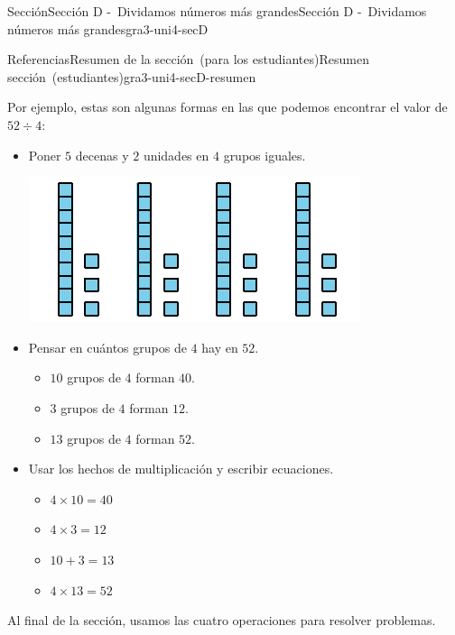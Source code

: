 \documentclass[oneside,10pt,]{article}
\begin{document}
\begin{sectionptx}{Sección}{Sección D -~Dividamos números más grandes}{}{Sección D -~Dividamos números más grandes}{}{}{gra3-uni4-secD}
\begin{references-subsection}{Referencias}{Resumen de la sección~(para los estudiantes)}{}{Resumen sección~(estudiantes)}{}{}{gra3-uni4-secD-resumen}
\par
Por ejemplo, estas son algunas formas en las que podemos encontrar el valor de \(52 \div 4\):%
%
\begin{itemize}[label=\textbullet]
\item{}Poner \(5\) decenas y \(2\) unidades en \(4\) grupos iguales.%
\begin{image}{0}{1}{0}{}%
\includegraphics[width=\linewidth]{external/svg-source/tikz-file-147697-scale13.pdf}
\end{image}%
\item{}Pensar en cuántos grupos de \(4\) hay en \(52\).%
%
\begin{itemize}[label=$\circ$]
\item{}\(10\) grupos de \(4\) forman \(40\).%
\item{}\(3\) grupos de \(4\) forman \(12\).%
\item{}\(13\) grupos de \(4\) forman \(52\).%
\end{itemize}
\item{}Usar los hechos de multiplicación y escribir ecuaciones.%
%
\begin{itemize}[label=$\circ$]
\item{}\(\displaystyle 4 \times 10 = 40\)%
\item{}\(\displaystyle 4 \times 3 = 12\)%
\item{}\(\displaystyle 10 + 3 = 13\)%
\item{}\(\displaystyle 4 \times 13 = 52\)%
\end{itemize}
\end{itemize}
Al final de la sección, usamos las cuatro operaciones para resolver problemas.%
\end{references-subsection}
\end{sectionptx}
%
%
\typeout{************************************************}
\typeout{************************************************}
%
\end{document}
